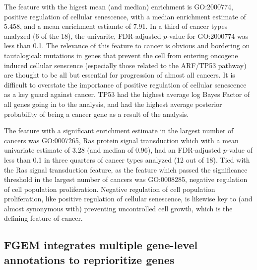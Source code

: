 The feature with the higest mean (and median) enrichment is GO:2000774, positive regulation of cellular senescence, with a median enrichment estimate of 5.458, and a mean enrichment estiamte of 7.91.  In a third of cancer types analyzed (6 of the 18), the univarite, FDR-adjusted $p$-value for GO:2000774 was less than 0.1.  The relevance of this feature to cancer is obvious and bordering on tautalogical: mutations in genes that prevent the cell from entering oncogene induced cellular senscence (especially those related to the ARF/TP53 pathway)  are thought to be all but essential for progression of almost all cancers\cite{chandeck10_oncog_induc_cellul_senes}.  It is difficult to overstate the importance of positive regulation of cellular senescence as a key guard against cancer.  TP53 had the highest average log Bayes Factor of all genes going in to the analysis, and had the highest average posterior probability of being a cancer gene as a result of the analysis.

The feature with a significant enrichment estimate in the largest number of cancers was GO:0007265, Ras protein signal transduction which with a mean univariate estimate of 3.28 (and median of 0.96), had an FDR-adjusted $p$-value of less than 0.1 in three quarters of cancer types analyzed (12 out of 18).  Tied with the Ras signal transduction feature, as the feature which passed the significance threshold in the largest number of cancers was GO:0008285, negative regulation of cell population proliferation.  Negative regulation of cell population proliferation, like positive regulation of cellular senescence, is likewise key to (and almost synonymous with) preventing uncontrolled cell growth, which is the defining feature of cancer.





\subsection{FGEM integrates multiple gene-level annotations to reprioritize genes}
\label{sec:orgf0225be}



